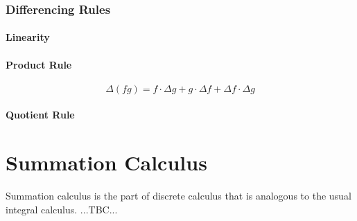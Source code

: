 





\subsubsection{Differencing Rules}  



\paragraph{Linearity}

\paragraph{Product Rule}
\begin{equation}
 \Delta (f g) = f \cdot \Delta g + g \cdot \Delta f + \Delta f \cdot \Delta g
\end{equation}



\paragraph{Quotient Rule}


\section{Summation Calculus}
Summation calculus is the part of discrete calculus that is analogous to the usual integral calculus. ...TBC...



